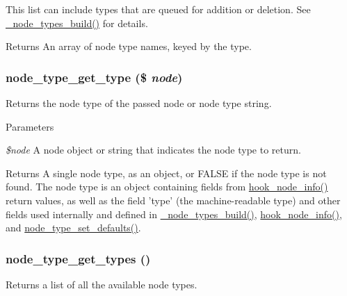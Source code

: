 This list can include types that are queued for addition or deletion. See \hyperlink{node_8module_a31b891b6c1ffba98fd4478e4255e301b}{\_\-node\_\-types\_\-build()} for details.

\begin{DoxyReturn}{Returns}
An array of node type names, keyed by the type. 
\end{DoxyReturn}
\hypertarget{node_8module_a0989ce8c8f1d5abbf5db159c77e68fc4}{
\subsubsection[{node\_\-type\_\-get\_\-type}]{\setlength{\rightskip}{0pt plus 5cm}node\_\-type\_\-get\_\-type (\$ {\em node})}}
\label{node_8module_a0989ce8c8f1d5abbf5db159c77e68fc4}
Returns the node type of the passed node or node type string.


\begin{DoxyParams}{Parameters}
\item[{\em \$node}]A node object or string that indicates the node type to return.\end{DoxyParams}
\begin{DoxyReturn}{Returns}
A single node type, as an object, or FALSE if the node type is not found. The node type is an object containing fields from \hyperlink{group__node__api__hooks_ga3b6ad51d7815d1cdd093b0e0f350cbd0}{hook\_\-node\_\-info()} return values, as well as the field 'type' (the machine-\/readable type) and other fields used internally and defined in \hyperlink{node_8module_a31b891b6c1ffba98fd4478e4255e301b}{\_\-node\_\-types\_\-build()}, \hyperlink{group__node__api__hooks_ga3b6ad51d7815d1cdd093b0e0f350cbd0}{hook\_\-node\_\-info()}, and \hyperlink{node_8module_a09f802ffaf307aebf9578a93fed025f9}{node\_\-type\_\-set\_\-defaults()}. 
\end{DoxyReturn}
\hypertarget{node_8module_a262f15c6263315491887a08914dfe126}{
\subsubsection[{node\_\-type\_\-get\_\-types}]{\setlength{\rightskip}{0pt plus 5cm}node\_\-type\_\-get\_\-types ()}}
\label{node_8module_a262f15c6263315491887a08914dfe126}
Returns a list of all the available node types.

